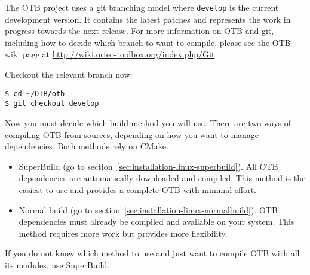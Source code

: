 The OTB project uses a git branching model where \texttt{develop} is the current development version.
It contains the latest patches and represents the work in progress towards the next release.
For more information on OTB and git, including how to decide which branch to want to compile, please see the
OTB wiki page at \url{http://wiki.orfeo-toolbox.org/index.php/Git}.

Checkout the relevant branch now:
\begin{verbatim}
$ cd ~/OTB/otb
$ git checkout develop
\end{verbatim}

Now you must decide which build method you will use.
There are two ways of compiling OTB from sources, depending on how you want to manage dependencies.
Both methods rely on CMake.
\begin{itemize}
\item SuperBuild (go to section~\ref{sec:installation-linux-superbuild}). All OTB dependencies are automatically downloaded and compiled.
This method is the easiest to use and provides a complete OTB with minimal effort.
\item Normal build (go to section~\ref{sec:installation-linux-normalbuild}). OTB dependencies must already be compiled and available on your system.
This method requires more work but provides more flexibility.
\end{itemize}
If you do not know which method to use and just want to compile OTB with all its modules, use SuperBuild.

